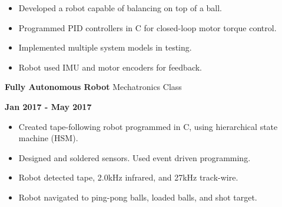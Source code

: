 \documentclass[paper=a4,fontsize=11pt]{article} %
\def \sectionSpace   {0.009\textheight} %
\def \leftColSpace      {0.1\textwidth} %
\def \middleColSpace    {0.75\textwidth}%
\def \bigMiddleColSpace {0.8\textwidth} %
\def \rightColSpace {0.25\textwidth}    %
\begin{document}
    \noindent
    \begin{minipage}[t]{\leftColSpace}
        \hfill
    \end{minipage}
    \begin{minipage}[t]{\bigMiddleColSpace}
        \begin{itemize}[noitemsep,topsep=0pt]
        \item Developed a robot capable of balancing on top of a ball. 
        \item Programmed PID controllers in C for closed-loop motor torque control. 
        \item Implemented multiple system models in testing. 
        \item Robot used IMU and motor encoders for feedback.
        \end{itemize}
    \end{minipage}

    \vspace{\sectionSpace}  
    \noindent
    \begin{minipage}[t]{\leftColSpace}
        \noindent \hfill
    \end{minipage}
    \begin{minipage}[t]{\middleColSpace}
        \noindent \textbf{Fully Autonomous Robot} \quad Mechatronics Class
    \end{minipage}
    \begin{minipage}[t]{\rightColSpace}
        \noindent \textbf{Jan 2017 - May 2017}
    \end{minipage}

    \noindent
    \begin{minipage}[t]{\leftColSpace}
        \hfill
    \end{minipage}
    \begin{minipage}[t]{\bigMiddleColSpace}
        \begin{itemize}[noitemsep,topsep=0pt]
        \item Created tape-following robot programmed in C, using hierarchical state machine (HSM). 
        \item Designed and soldered sensors. Used event driven programming. 
        \item Robot detected tape, 2.0kHz infrared, and 27kHz track-wire.\item Robot navigated to ping-pong balls, loaded balls, and shot target.
        \end{itemize}
    \end{minipage}
\end{document}
